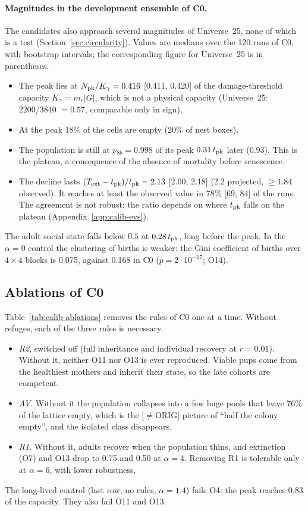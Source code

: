 \paragraph{Magnitudes in the development ensemble of \textsf{C0}.}
The candidates also approach several magnitudes of Universe~25, none of which is a test (Section~\ref{sec:circularity}).
Values are medians over the 120 runs of
\textsf{C0}, with bootstrap intervals; the corresponding figure for Universe~25 is in parentheses.
\begin{itemize}
  \item The peak lies at $N_{\rm pk}/K_\gamma=0.416$ [0.411, 0.420] of the damage-threshold capacity
    $K_\gamma=m_c|G|$, which is not a physical capacity (Universe~25: 2200/3840 $=0.57$, comparable only in sign).
  \item At the peak 18\% of the cells are empty (20\% of nest boxes).
  \item The population is still at $\nu_{8b}=0.998$ of its peak $0.31\,t_{\rm pk}$ later (0.93). This is the
    plateau, a consequence of the absence of mortality before senescence.
  \item The decline lasts $(T_{\rm ext}-t_{\rm pk})/t_{\rm pk}=2.13$ [2.00, 2.18] (2.2 projected, $\ge1.84$
    observed). It reaches at least the observed value in 78\% [69, 84] of the runs. The agreement is not robust:
    the ratio depends on where $t_{\rm pk}$ falls on the plateau (Appendix~\ref{app:calib-evs}).
\end{itemize}
The adult social state falls below $0.5$ at $0.28\,t_{\rm pk}$, long before the peak. In the $\alpha=0$
control the clustering of births is weaker: the Gini coefficient of births over $4\times4$ blocks is 0.075,
against 0.168 in \textsf{C0} ($p=2\cdot10^{-17}$; O14).

\subsection{Ablations of \textsf{C0}}
\label{app:calib-ablations}

Table~\ref{tab:calib-ablations} removes the rules of \textsf{C0} one at a time. Without refuges, each of the
three rules is necessary.
\begin{itemize}
  \item \emph{R2}, switched off (full inheritance and individual recovery at $r=0.01$). Without it,
    neither O11 nor O13 is ever reproduced. Viable pups come from the healthiest mothers and inherit their
    state, so the late cohorts are competent.
  \item \emph{AV}. Without it the population collapses into a few huge pools that leave 76\% of the
    lattice empty, which is the [$\ne$ORIG] picture of ``half the colony empty'', and the isolated class
    disappears.
  \item \emph{R1}. Without it, adults recover when the population thins, and extinction (O7) and O13 drop
    to 0.75 and 0.50 at $\alpha=4$. Removing R1 is tolerable only at $\alpha=6$, with lower robustness.
\end{itemize}
The long-lived control (last row; no rules, $\alpha=1.4$) fails O4: the peak reaches 0.83 of the capacity.
They also fail O11 and O13.

